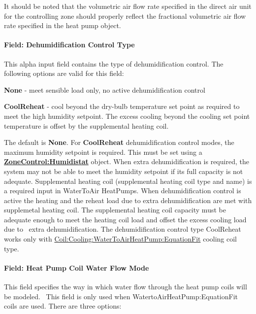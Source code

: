 It should be noted that the volumetric air flow rate specified in the direct air unit for the controlling zone should properly reflect the fractional volumetric air flow rate specified in the heat pump object.

\paragraph{Field: Dehumidification Control Type}\label{field-dehumidification-control-type-4-000}

This alpha input field contains the type of dehumidification control. The following options are valid for this field:

\textbf{None} - meet sensible load only, no active dehumidification control

\textbf{CoolReheat} - cool beyond the dry-bulb temperature set point as required to meet the high humidity setpoint. The excess cooling beyond the cooling set point temperature is offset by the supplemental heating coil.

The default is \textbf{None}. For \textbf{CoolReheat} dehumidification control modes, the maximum humidity setpoint is required. This must be set using a \textbf{\hyperref[zonecontrolhumidistat]{ZoneControl:Humidistat}} object. When extra dehumidification is required, the system may not be able to meet the humidity setpoint if its full capacity is not adequate. Supplemental heating coil (supplemental heating coil type and name) is a required input in WaterToAir HeatPumps. When dehumidification control is active the heating and the reheat load due to extra dehumidification are met with supplemetal heating coil. The supplemental heating coil capacity must be adequate enough to meet the heating coil load and offset the excess cooling load due to~ extra dehumidification. The dehumidification control type CoolReheat works only with \hyperref[coilcoolingwatertoairheatpumpequationfit]{Coil:Cooling:WaterToAirHeatPump:EquationFit} cooling coil type.

\paragraph{Field: Heat Pump Coil Water Flow Mode}\label{field-heat-pump-coil-water-flow-mode-000}

This field specifies the way in which water flow through the heat pump coils will be modeled.~ This field is only used when WatertoAirHeatPump:EquationFit coils are used. There are three options:

